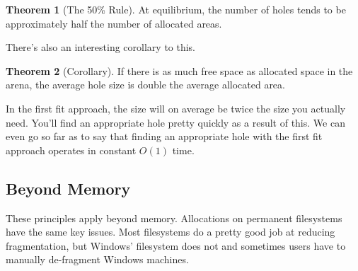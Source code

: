 \documentclass[]{article}
\theoremstyle{definition}
\newtheorem*{theorem}{Theorem}
\begin{document}
			\begin{theorem}[The 50\% Rule]
				At equilibrium, the number of holes tends to be approximately half the number of allocated areas.
			\end{theorem}
			
			There's also an interesting corollary to this.
			
			\begin{theorem}[Corollary]
				If there is as much free space as allocated space in the arena, the average hole size is double the average allocated area.
			\end{theorem}
			
			In the first fit approach, the size will on average be twice the size you actually need. You'll find an appropriate hole pretty quickly as a result of this. We can even go so far as to say that finding an appropriate hole with the first fit approach operates in constant $O(1)$ time.
		
		\subsection{Beyond Memory}
			These principles apply beyond memory. Allocations on permanent filesystems have the same key issues. Most filesystems do a pretty good job at reducing fragmentation, but Windows' filesystem does not and sometimes users have to manually de-fragment Windows machines.
\end{document}
